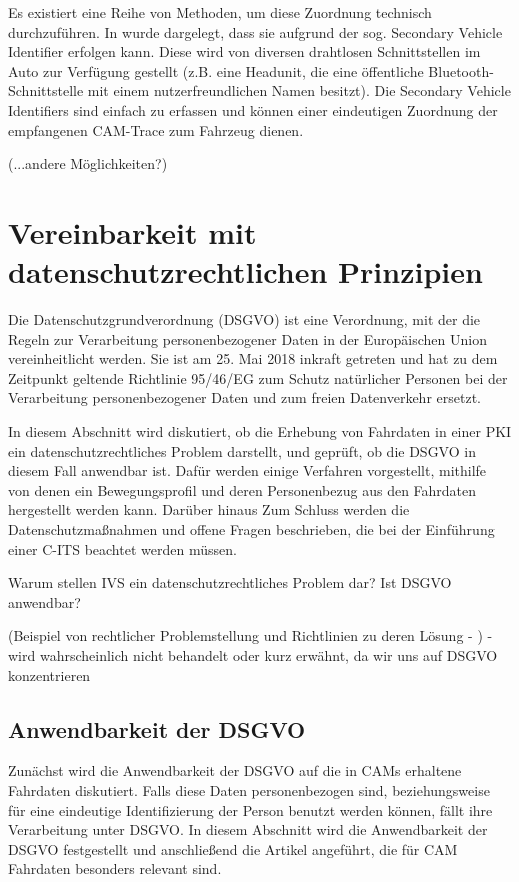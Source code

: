 Es existiert eine Reihe von Methoden, um diese Zuordnung technisch durchzuführen. In \cite{Ullmann2016} wurde dargelegt, dass sie aufgrund der sog. Secondary Vehicle Identifier erfolgen kann. Diese wird von diversen drahtlosen Schnittstellen im Auto zur Verfügung gestellt (z.B. eine Headunit, die eine öffentliche Bluetooth-Schnittstelle mit einem nutzerfreundlichen Namen besitzt). Die Secondary Vehicle Identifiers sind einfach zu erfassen und können einer eindeutigen Zuordnung der empfangenen CAM-Trace zum Fahrzeug dienen. 


(...andere Möglichkeiten?)


\section{Vereinbarkeit mit datenschutzrechtlichen Prinzipien}
\label{ch:SecondContentSection}

Die Datenschutzgrundverordnung (DSGVO) ist eine Verordnung, mit der die Regeln zur Verarbeitung personenbezogener Daten in der Europäischen Union vereinheitlicht werden. Sie ist am 25. Mai 2018 inkraft getreten und hat zu dem Zeitpunkt geltende Richtlinie 95/46/EG zum Schutz natürlicher Personen bei der Verarbeitung personenbezogener Daten und zum freien Datenverkehr ersetzt. 

In diesem Abschnitt wird diskutiert, ob die Erhebung von Fahrdaten in einer PKI ein datenschutzrechtliches Problem darstellt, und geprüft, ob die DSGVO in diesem Fall anwendbar ist. Dafür werden einige Verfahren vorgestellt, mithilfe von denen ein Bewegungsprofil und deren Personenbezug aus den Fahrdaten hergestellt werden kann. Darüber hinaus 
Zum Schluss werden die Datenschutzmaßnahmen und offene Fragen beschrieben, die bei der Einführung einer C-ITS beachtet werden müssen. 

Warum stellen IVS ein datenschutzrechtliches Problem dar? Ist DSGVO anwendbar? 

(Beispiel von rechtlicher Problemstellung und Richtlinien zu deren Lösung - \cite{EUCooperativeV2X} ) - wird wahrscheinlich nicht behandelt oder kurz erwähnt, da wir uns auf DSGVO konzentrieren

\subsection{Anwendbarkeit der DSGVO}
\label{sec:SecondContentSection:SecondSubsection}

Zunächst wird die Anwendbarkeit der DSGVO auf die in CAMs erhaltene Fahrdaten diskutiert. Falls diese Daten personenbezogen sind, beziehungsweise für eine eindeutige Identifizierung der Person benutzt werden können, fällt ihre Verarbeitung unter DSGVO. In diesem Abschnitt wird die Anwendbarkeit der DSGVO festgestellt und anschließend die Artikel angeführt, die für CAM Fahrdaten besonders relevant sind. 

